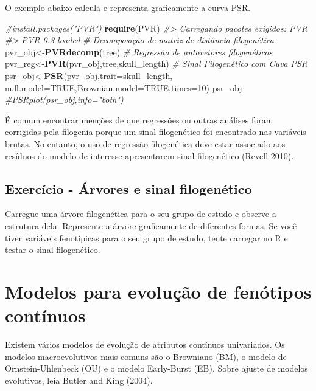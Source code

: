 \documentclass[
]{book}
\newenvironment{Shaded}{\begin{snugshade}}{\end{snugshade}}
\newcommand{\AttributeTok}[1]{\textcolor[rgb]{0.13,0.29,0.53}{#1}}
\newcommand{\CommentTok}[1]{\textcolor[rgb]{0.56,0.35,0.01}{\textit{#1}}}
\newcommand{\ConstantTok}[1]{\textcolor[rgb]{0.56,0.35,0.01}{#1}}
\newcommand{\DecValTok}[1]{\textcolor[rgb]{0.00,0.00,0.81}{#1}}
\newcommand{\FunctionTok}[1]{\textcolor[rgb]{0.13,0.29,0.53}{\textbf{#1}}}
\newcommand{\NormalTok}[1]{#1}
\newcommand{\OtherTok}[1]{\textcolor[rgb]{0.56,0.35,0.01}{#1}}
\begin{document}
O exemplo abaixo calcula e representa graficamente a curva PSR.

\begin{Shaded}
\begin{Highlighting}[]
\CommentTok{\#install.packages("PVR")}
\FunctionTok{require}\NormalTok{(PVR)}
\CommentTok{\#\textgreater{} Carregando pacotes exigidos: PVR}
\CommentTok{\#\textgreater{} PVR 0.3 loaded}
\CommentTok{\# Decomposição de matriz de distância filogenética}
\NormalTok{pvr\_obj}\OtherTok{\textless{}{-}}\FunctionTok{PVRdecomp}\NormalTok{(tree)}
\CommentTok{\# Regressão de autovetores filogenéticos}
\NormalTok{pvr\_reg}\OtherTok{\textless{}{-}}\FunctionTok{PVR}\NormalTok{(pvr\_obj,tree,skull\_length)}
\CommentTok{\# Sinal Filogenético com Cuva PSR}
\NormalTok{psr\_obj}\OtherTok{\textless{}{-}}\FunctionTok{PSR}\NormalTok{(pvr\_obj,}\AttributeTok{trait=}\NormalTok{skull\_length,}
\AttributeTok{null.model=}\ConstantTok{TRUE}\NormalTok{,}\AttributeTok{Brownian.model=}\ConstantTok{TRUE}\NormalTok{,}\AttributeTok{times=}\DecValTok{10}\NormalTok{)}
\NormalTok{psr\_obj}
\CommentTok{\#PSRplot(psr\_obj,info="both")}
\end{Highlighting}
\end{Shaded}

É comum encontrar menções de que regressões ou outras análises foram corrigidas pela filogenia porque um sinal filogenético foi encontrado nas variáveis brutas. No entanto, o uso de regressão filogenética deve estar associado aos resíduos do modelo de interesse apresentarem sinal filogenético (Revell 2010).

\section{Exercício - Árvores e sinal filogenético}\label{exercuxedcio---uxe1rvores-e-sinal-filogenuxe9tico}

Carregue uma árvore filogenética para o seu grupo de estudo e observe a estrutura dela. Represente a árvore graficamente de diferentes formas. Se você tiver variáveis fenotípicas para o seu grupo de estudo, tente carregar no R e testar o sinal filogenético.

\chapter{Modelos para evolução de fenótipos contínuos}\label{modelos-para-evoluuxe7uxe3o-de-fenuxf3tipos-contuxednuos}

Existem vários modelos de evolução de atributos contínuos univariados. Os modelos macroevolutivos mais comuns são o Browniano (BM), o modelo de Ornstein-Uhlenbeck (OU) e o modelo Early-Burst (EB). Sobre ajuste de modelos evolutivos, leia Butler and King (2004).
\end{document}

